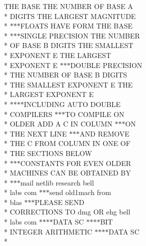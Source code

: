 \begin{DoxyCompactItemize}
\item 
T\+H\+E B\+A\+S\+E T\+H\+E N\+U\+M\+B\+E\+R O\+F B\+A\+S\+E A \\*
D\+I\+G\+I\+T\+S T\+H\+E L\+A\+R\+G\+E\+S\+T M\+A\+G\+N\+I\+T\+U\+D\+E \\*
$\ast$$\ast$$\ast$F\+L\+O\+A\+T\+S H\+A\+V\+E F\+O\+R\+M T\+H\+E B\+A\+S\+E \\*
$\ast$$\ast$$\ast$S\+I\+N\+G\+L\+E P\+R\+E\+C\+I\+S\+I\+O\+N T\+H\+E N\+U\+M\+B\+E\+R \\*
O\+F B\+A\+S\+E B D\+I\+G\+I\+T\+S T\+H\+E S\+M\+A\+L\+L\+E\+S\+T \\*
E\+X\+P\+O\+N\+E\+N\+T E T\+H\+E L\+A\+R\+G\+E\+S\+T \\*
E\+X\+P\+O\+N\+E\+N\+T E $\ast$$\ast$$\ast$D\+O\+U\+B\+L\+E P\+R\+E\+C\+I\+S\+I\+O\+N \\*
T\+H\+E N\+U\+M\+B\+E\+R O\+F B\+A\+S\+E B D\+I\+G\+I\+T\+S \\*
T\+H\+E S\+M\+A\+L\+L\+E\+S\+T E\+X\+P\+O\+N\+E\+N\+T E T\+H\+E \\*
L\+A\+R\+G\+E\+S\+T E\+X\+P\+O\+N\+E\+N\+T E \\*
$\ast$$\ast$$\ast$$\ast$I\+N\+C\+L\+U\+D\+I\+N\+G A\+U\+T\+O D\+O\+U\+B\+L\+E \\*
C\+O\+M\+P\+I\+L\+E\+R\+S $\ast$$\ast$$\ast$T\+O C\+O\+M\+P\+I\+L\+E O\+N \\*
O\+L\+D\+E\+R A\+D\+D A C I\+N C\+O\+L\+U\+M\+N $\ast$$\ast$$\ast$O\+N \\*
T\+H\+E N\+E\+X\+T L\+I\+N\+E $\ast$$\ast$$\ast$A\+N\+D R\+E\+M\+O\+V\+E \\*
T\+H\+E C F\+R\+O\+M C\+O\+L\+U\+M\+N I\+N O\+N\+E O\+F \\*
T\+H\+E S\+E\+C\+T\+I\+O\+N\+S B\+E\+L\+O\+W \\*
$\ast$$\ast$$\ast$C\+O\+N\+S\+T\+A\+N\+T\+S F\+O\+R E\+V\+E\+N O\+L\+D\+E\+R \\*
M\+A\+C\+H\+I\+N\+E\+S C\+A\+N B\+E O\+B\+T\+A\+I\+N\+E\+D B\+Y \\*
$\ast$$\ast$$\ast$mail netlib research bell \\*
labs com $\ast$$\ast$$\ast$send old1mach from \\*
blas $\ast$$\ast$$\ast$P\+L\+E\+A\+S\+E S\+E\+N\+D \\*
C\+O\+R\+R\+E\+C\+T\+I\+O\+N\+S T\+O dmg O\+R ehg bell \\*
labs com $\ast$$\ast$$\ast$$\ast$D\+A\+T\+A S\+C $\ast$$\ast$$\ast$$\ast$B\+I\+T \\*
I\+N\+T\+E\+G\+E\+R A\+R\+I\+T\+H\+M\+E\+T\+I\+C $\ast$$\ast$$\ast$$\ast$D\+A\+T\+A S\+C \\*

\end{DoxyCompactItemize}
